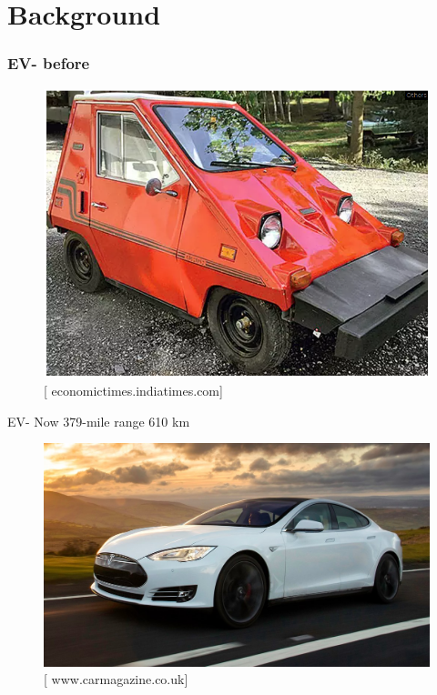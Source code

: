 \documentclass[aspectratio=169]{beamer}
\begin{document}

	
	

	
	\section{Background}
\begin{frame}
\frametitle{EV- before}


\begin{figure}
        \includegraphics[scale=0.4]{Figures/EV80s.png}
        \caption{[ economictimes.indiatimes.com]}
        \end{figure}
\end{frame}
\begin{frame}{EV- Now 379-mile range 610 km}
\begin{figure}
        \includegraphics[scale=0.3]{Figures/EV2020.jpg}
        \caption{ [
 www.carmagazine.co.uk]}
        \end{figure}
\end{frame}
\end{document}
